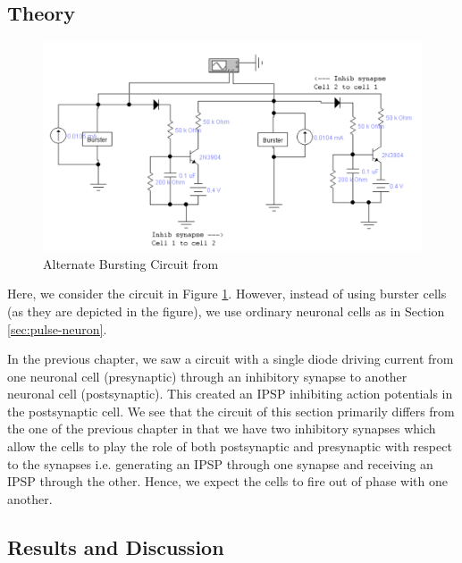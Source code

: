\documentclass[12]{book}
\newcommand\0{\mathbf{0}}
\newcommand\<{\langle}
\renewcommand\>{\rangle}
\begin{document}
\subsection{Theory}

\begin{figure}[h]
\centering
\includegraphics[width=\textwidth]{pattern_circuit}	
\caption{Alternate Bursting Circuit from \cite{maeda2000pulse}}
\label{fig:pattern}
\end{figure}

Here, we consider the circuit in Figure \ref{fig:pattern}. However, instead of using burster cells (as they are depicted in the figure), we use ordinary neuronal cells as in Section \ref{sec:pulse-neuron}.

In the previous chapter, we saw a circuit with a single diode driving current from one neuronal cell (presynaptic) through an inhibitory synapse to another neuronal cell (postsynaptic). This created an IPSP inhibiting action potentials in the postsynaptic cell. We see that the circuit of this section primarily differs from the one of the previous chapter in that we have two inhibitory synapses which allow the cells to play the role of both postsynaptic and presynaptic with respect to the synapses i.e. generating an IPSP through one synapse and receiving an IPSP through the other. Hence, we expect the cells to fire out of phase with one another.

\subsection{Results and Discussion}
\end{document}
